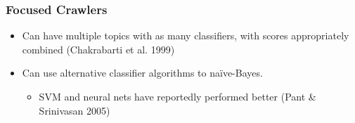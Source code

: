 \documentclass{beamer}
\begin{document}
\begin{frame} \frametitle{Focused Crawlers}

\begin{itemize}
\item Can have multiple topics with as many classifiers, with scores appropriately combined (Chakrabarti et al. 1999)






\item Can use alternative classifier algorithms to naïve-Bayes.
\begin{itemize} 
  \item SVM and neural nets have reportedly performed better (Pant \&
    Srinivasan 2005)
\end{itemize}

\end{itemize}
\end{frame}
\end{document}
